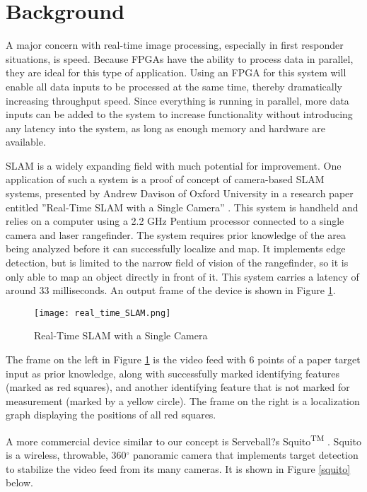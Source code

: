 \section{Background}
A major concern with real-time image processing, especially in first responder situations, is speed. Because FPGAs have the ability to process data in parallel, they are ideal for this type of application. Using an FPGA for this system will enable all data inputs to be processed at the same time, thereby dramatically increasing throughput speed. Since everything is running in parallel, more data inputs can be added to the system to increase functionality without introducing any latency into the system, as long as enough memory and hardware are available.
\par
SLAM is a widely expanding field with much potential for improvement. One application of such a system is a proof of concept of camera-based SLAM systems, presented by Andrew Davison of Oxford University in a research paper entitled ''Real-Time SLAM with a Single Camera'' \cite{davison}. This system is handheld and relies on a computer using a 2.2 GHz Pentium processor connected to a single camera and laser rangefinder. The system requires prior knowledge of the area being analyzed before it can successfully localize and map. It implements edge detection, but is limited to the narrow field of vision of the rangefinder, so it is only able to map an object directly in front of it. This system carries a latency of around 33 milliseconds. An output frame of the device is shown in Figure \ref{rtSLAM}.

\begin{figure}[H]
	\centerline{\texttt{[image: real\_time\_SLAM.png]}}
	\caption{Real-Time SLAM with a Single Camera \cite{davison}}
	\label{rtSLAM}
\end{figure}

The frame on the left in Figure \ref{rtSLAM} is the video feed with 6 points of a paper target input as prior knowledge, along with successfully marked identifying features (marked as red squares), and another identifying feature that is not marked for measurement (marked by a yellow circle). The frame on the right is a localization graph displaying the positions of all red squares.
\par
A more commercial device similar to our concept is Serveball?s Squito\textsuperscript{TM} \cite{serveball}. Squito is a wireless, throwable, 360$^{\circ}$ panoramic camera that implements target detection to stabilize the video feed from its many cameras. It is shown in Figure \ref{squito} below.

